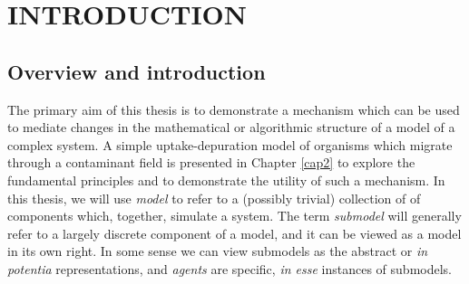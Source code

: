 



\chapter[INTRODUCTION]{INTRODUCTION}

\section{Overview and introduction}

The primary aim of this thesis is to demonstrate a mechanism which can
be used to mediate changes in the mathematical or algorithmic
structure of a model of a complex system. A simple uptake-depuration
model of organisms which migrate through a contaminant field is
presented in Chapter \ref{cap2} to explore the fundamental principles
and to demonstrate the utility of such a mechanism. In this thesis, we
will use \emph{model} to refer to a (possibly trivial) collection of
of components which, together, simulate a system. The term
\emph{submodel} will generally refer to a largely discrete component
of a model, and it can be viewed as a model in its own right.  In some
sense we can view submodels as the abstract or \emph{in potentia}
representations, and \emph{agents} are specific, \emph{in esse}
instances of submodels.


